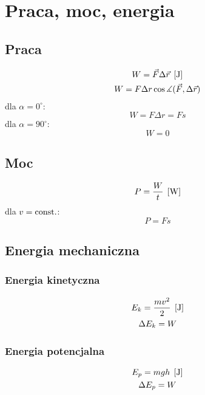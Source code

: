 \chapter{Praca, moc, energia}

\section{Praca}
\begin{equation}
  \begin{gathered}
    W = \vec F \Delta \vec r \;\left[\mathrm{J}\right]\\
    W = F \Delta r \cos\measuredangle(\vec F, \Delta \vec r)
  \end{gathered}
\end{equation}
dla $\alpha = 0^\circ$:
\begin{equation*}
  W = F \Delta r = Fs
\end{equation*}
dla $\alpha = 90^\circ$:
\begin{equation*}
  W = 0
\end{equation*}

\section{Moc}
\begin{equation}
  P = \frac W t \;\left[\mathrm{W}\right]
\end{equation}
dla $v = \operatorname{const.}$:
\begin{equation*}
  P = Fs
\end{equation*}

\section{Energia mechaniczna}

\subsection{Energia kinetyczna}
\begin{equation}
  \begin{gathered}
    E_k = \frac{mv^2}{2} \;\left[\mathrm{J}\right]\\
    \Delta E_k = W
  \end{gathered}
\end{equation}

\subsection{Energia potencjalna}
\begin{equation}
  \begin{gathered}
    E_p = mgh \;\left[\mathrm{J}\right]\\
    \Delta E_p = W
  \end{gathered}
\end{equation}


